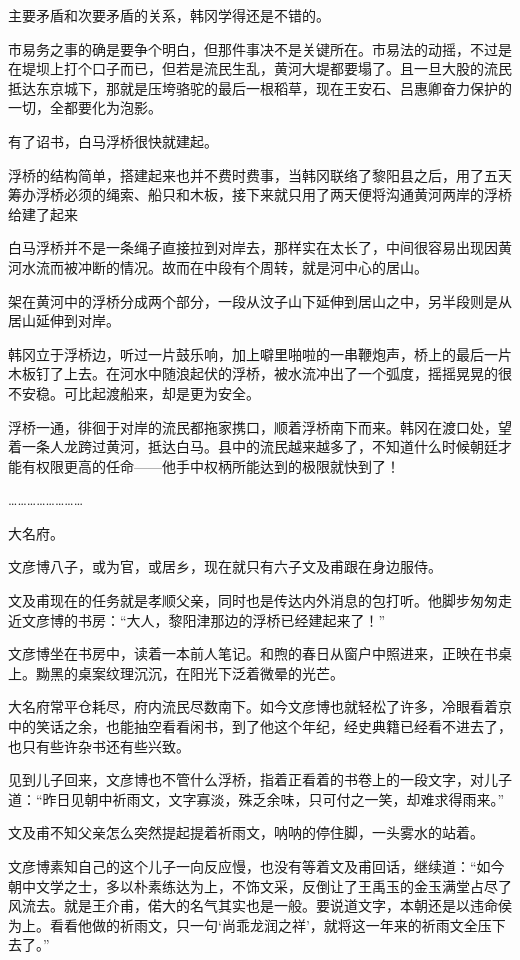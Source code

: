 主要矛盾和次要矛盾的关系，韩冈学得还是不错的。

市易务之事的确是要争个明白，但那件事决不是关键所在。市易法的动摇，不过是在堤坝上打个口子而已，但若是流民生乱，黄河大堤都要塌了。且一旦大股的流民抵达东京城下，那就是压垮骆驼的最后一根稻草，现在王安石、吕惠卿奋力保护的一切，全都要化为泡影。

有了诏书，白马浮桥很快就建起。

浮桥的结构简单，搭建起来也并不费时费事，当韩冈联络了黎阳县之后，用了五天筹办浮桥必须的绳索、船只和木板，接下来就只用了两天便将沟通黄河两岸的浮桥给建了起来

白马浮桥并不是一条绳子直接拉到对岸去，那样实在太长了，中间很容易出现因黄河水流而被冲断的情况。故而在中段有个周转，就是河中心的居山。

架在黄河中的浮桥分成两个部分，一段从汶子山下延伸到居山之中，另半段则是从居山延伸到对岸。

韩冈立于浮桥边，听过一片鼓乐响，加上噼里啪啦的一串鞭炮声，桥上的最后一片木板钉了上去。在河水中随浪起伏的浮桥，被水流冲出了一个弧度，摇摇晃晃的很不安稳。可比起渡船来，却是更为安全。

浮桥一通，徘徊于对岸的流民都拖家携口，顺着浮桥南下而来。韩冈在渡口处，望着一条人龙跨过黄河，抵达白马。县中的流民越来越多了，不知道什么时候朝廷才能有权限更高的任命——他手中权柄所能达到的极限就快到了！

……………………

大名府。

文彦博八子，或为官，或居乡，现在就只有六子文及甫跟在身边服侍。

文及甫现在的任务就是孝顺父亲，同时也是传达内外消息的包打听。他脚步匆匆走近文彦博的书房：“大人，黎阳津那边的浮桥已经建起来了！”

文彦博坐在书房中，读着一本前人笔记。和煦的春日从窗户中照进来，正映在书桌上。黝黑的桌案纹理沉沉，在阳光下泛着微晕的光芒。

大名府常平仓耗尽，府内流民尽数南下。如今文彦博也就轻松了许多，冷眼看着京中的笑话之余，也能抽空看看闲书，到了他这个年纪，经史典籍已经看不进去了，也只有些许杂书还有些兴致。

见到儿子回来，文彦博也不管什么浮桥，指着正看着的书卷上的一段文字，对儿子道：“昨日见朝中祈雨文，文字寡淡，殊乏余味，只可付之一笑，却难求得雨来。”

文及甫不知父亲怎么突然提起提着祈雨文，呐呐的停住脚，一头雾水的站着。

文彦博素知自己的这个儿子一向反应慢，也没有等着文及甫回话，继续道：“如今朝中文学之士，多以朴素练达为上，不饰文采，反倒让了王禹玉的金玉满堂占尽了风流去。就是王介甫，偌大的名气其实也是一般。要说道文字，本朝还是以违命侯为上。看看他做的祈雨文，只一句‘尚乖龙润之祥’，就将这一年来的祈雨文全压下去了。”

